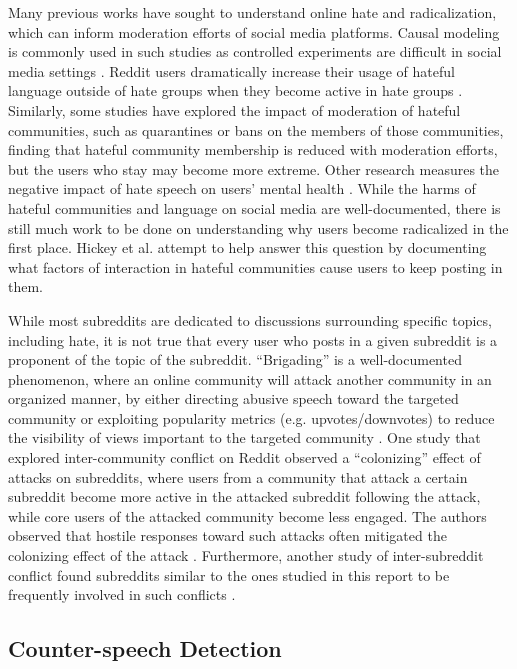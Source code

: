 \documentclass[10pt,twocolumn,letterpaper]{article}
\begin{document}
Many previous works have sought to understand online hate and radicalization, which can inform moderation efforts of social media platforms. Causal modeling is commonly used in such studies as controlled experiments are difficult in social media settings \cite{founta2021survey}. Reddit users dramatically increase their usage of hateful language outside of hate groups when they become active in hate groups \cite{Schmitz2022}. Similarly, some studies have explored the impact of moderation of hateful communities, such as quarantines \cite{chandrasekharan2020quarantined} or bans \cite{horta2021platform} on the members of those communities, finding that hateful community membership is reduced with moderation efforts, but the users who stay may become more extreme. Other research measures the negative impact of hate speech on users' mental health \cite{saha2019prevalence}.
While the harms of hateful communities and language on social media are well-documented, there is still much work to be done on understanding why users become radicalized in the first place. Hickey et al. \cite{hickey2023reddit} attempt to help answer this question by documenting what factors of interaction in hateful communities cause users to keep posting in them.

While most subreddits are dedicated to discussions surrounding specific topics, including hate, it is not true that every user who posts in a given subreddit is a proponent of the topic of the subreddit. ``Brigading'' is a well-documented phenomenon, where an online community will attack another community in an organized manner, by either directing abusive speech toward the targeted community or exploiting popularity metrics (e.g. upvotes/downvotes) to reduce the visibility of views important to the targeted community \cite{graham2021sociomateriality, jhaver2018online}. One study that explored inter-community conflict on Reddit observed a ``colonizing'' effect of attacks on subreddits, where users from a community that attack a certain subreddit become more active in the attacked subreddit following the attack, while core users of the attacked community become less engaged. The authors observed that hostile responses toward such attacks often mitigated the colonizing effect of the attack \cite{kumar2018community}. Furthermore, another study of inter-subreddit conflict found subreddits similar to the ones studied in this report to be frequently involved in such conflicts \cite{datta2019extracting}.

\subsection{Counter-speech Detection}
\end{document}
